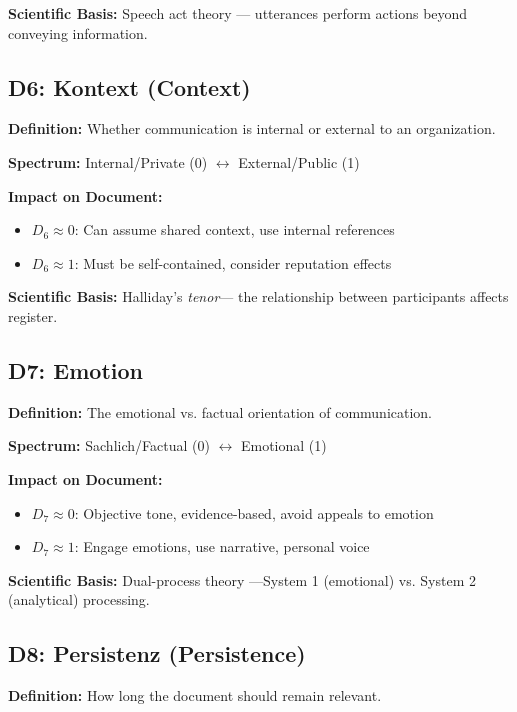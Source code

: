 \textbf{Scientific Basis:} Speech act theory \citep{austin1962, searle1969}---
utterances perform actions beyond conveying information.

\subsection{D6: Kontext (Context)}

\textbf{Definition:} Whether communication is internal or external to an organization.

\textbf{Spectrum:} Internal/Private (0) $\leftrightarrow$ External/Public (1)

\textbf{Impact on Document:}
\begin{itemize}[nosep]
\item $D_6 \approx 0$: Can assume shared context, use internal references
\item $D_6 \approx 1$: Must be self-contained, consider reputation effects
\end{itemize}

\textbf{Scientific Basis:} Halliday's \citeyearpar{halliday1989} \textit{tenor}---
the relationship between participants affects register.

\subsection{D7: Emotion}

\textbf{Definition:} The emotional vs. factual orientation of communication.

\textbf{Spectrum:} Sachlich/Factual (0) $\leftrightarrow$ Emotional (1)

\textbf{Impact on Document:}
\begin{itemize}[nosep]
\item $D_7 \approx 0$: Objective tone, evidence-based, avoid appeals to emotion
\item $D_7 \approx 1$: Engage emotions, use narrative, personal voice
\end{itemize}

\textbf{Scientific Basis:} Dual-process theory \citep{kahneman2011}---System 1
(emotional) vs. System 2 (analytical) processing.

\subsection{D8: Persistenz (Persistence)}

\textbf{Definition:} How long the document should remain relevant.

